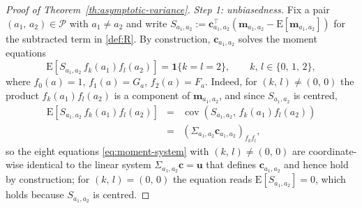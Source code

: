 \documentclass[sigconf]{acmart}
\newcommand{\E}{\mathrm E}
\DeclareMathOperator{\cov}{cov}
\begin{document}
\begin{proof}[Proof of Theorem~\ref{th:asymptotic-variance}]
    \emph{Step 1: unbiasedness.} Fix a pair $(a_1,\,a_2)\in\mathcal P$ with $a_1\neq a_2$ and write $S_{a_1,a_2} := \mathbf c_{a_1,a_2}^{\top}(\mathbf m_{a_1,a_2}-\E[\mathbf m_{a_1,a_2}])$ for the subtracted term in \eqref{def:R}. By construction, $\mathbf c_{a_1,a_2}$ solves the moment equations
    \begin{equation}\label{eq:moment-system}
        \E\left[S_{a_1,a_2}\, f_k(a_1)f_l(a_2)\right] = \mathbf 1\{k=l=2\},\qquad k,\,l\in\{0,\,1,\,2\},
    \end{equation}
    where $f_0(a)=1$, $f_1(a)=G_a$, $f_2(a)=F_a$. Indeed, for $(k,\,l)\neq(0,\,0)$ the product $f_k(a_1)f_l(a_2)$ is a component of $\mathbf m_{a_1,a_2}$, and since $S_{a_1,a_2}$ is centred,
    \begin{eqnarray*}
        \E\left[S_{a_1,a_2}\, f_k(a_1)f_l(a_2)\right] &=& \cov\left(S_{a_1,a_2},\,f_k(a_1)f_l(a_2)\right)\\
        &=& \left(\Sigma_{a_1,a_2}\mathbf c_{a_1,a_2}\right)_{f_kf_l},
    \end{eqnarray*}
    so the eight equations \eqref{eq:moment-system} with $(k,\,l)\neq(0,\,0)$ are coordinate-wise identical to the linear system $\Sigma_{a_1,a_2}\mathbf c = \mathbf u$ that defines $\mathbf c_{a_1,a_2}$ and hence hold by construction; for $(k,\,l)=(0,\,0)$ the equation reads $\E[S_{a_1,a_2}]=0$, which holds because $S_{a_1,a_2}$ is centred.


\end{proof}
\end{document}
